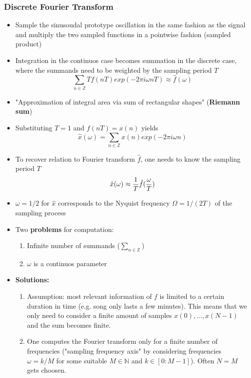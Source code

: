 \subsubsection*{Discrete Fourier Transform}
\begin{itemize}
    \item
        Sample the sinusoudal prototype oscillation in the same fashion as the signal and multiply the two sampled functions in a pointwise fashion (sampled product)
    \item
        Integration in the continuos case becomes summation in the discrete case, where the summands need to be weighted by the sampling period $T$
        $$\sum_{n \in \mathbb{Z}} T f(nT) exp(-2\pi i \omega n T) \approx \hat{f}(\omega)$$
    \item
        "Approximation of integral area via sum of rectangular shapes" (\textbf{Riemann sum})
    \item
        Substituting $T = 1$ and $f(nT) = x(n)$ yields
        $$ \hat{x}(\omega) = \sum_{n \in \mathbb{Z}} x(n) exp(-2\pi i \omega n) $$
    \item
        To recover relation to Fourier transform $\hat{f}$, one needs to know the sampling period $T$
        $$ \hat{x}(\omega) \approx \frac{\displaystyle 1}{\displaystyle T} \hat{f}(\frac{\displaystyle \omega}{\displaystyle T})$$
    \item
        $\omega = 1/2$ for $\hat{x}$ corresponds to the Nyquist frequency $\Omega = 1/(2T)$ of the sampling process
    \item
        Two \textbf{problems} for computation: 
        \begin{enumerate}
            \item
                Infinite number of summands ($\sum_{n \in \mathbb{Z}}$)
            \item
                $\omega$ is a continuos parameter
        \end{enumerate}
    \item
        \textbf{Solutions:}
        \begin{enumerate}
            \item
                Assumption: most relevant information of $f$ is limited to a certain duration in time (e.g. song only lasts a few minutes). This means that we only need to consider a finite amount of samples $x(0),\dots,x(N-1)$ and the sum becomes finite.
            \item
                One computes the Fourier transform only for a finite number of frequencies ("sampling frequency axis" by considering frequencies $\omega = k/M$ for some suitable $M \in \mathbb{N}$ and $k \in [0: M-1]$). Often $N=M$ gets choosen.

\end{enumerate}
\end{itemize}

